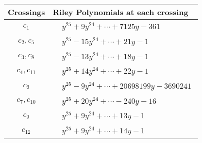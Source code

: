 \documentclass[1p]{elsarticle_modified}
\theoremstyle{definition}
\begin{document}
\begin{tabular}{m{50pt}|m{274pt}}
Crossings & \hspace{64pt}Riley Polynomials at each crossing \\
\hline $$\begin{aligned}c_{1}\end{aligned}$$&$\begin{aligned}
&y^{25}+9 y^{24}+\cdots+7125 y-361
\end{aligned}$\\
\hline $$\begin{aligned}c_{2},c_{5}\end{aligned}$$&$\begin{aligned}
&y^{25}-15 y^{24}+\cdots+21 y-1
\end{aligned}$\\
\hline $$\begin{aligned}c_{3},c_{8}\end{aligned}$$&$\begin{aligned}
&y^{25}-13 y^{24}+\cdots+18 y-1
\end{aligned}$\\
\hline $$\begin{aligned}c_{4},c_{11}\end{aligned}$$&$\begin{aligned}
&y^{25}+14 y^{24}+\cdots+22 y-1
\end{aligned}$\\
\hline $$\begin{aligned}c_{6}\end{aligned}$$&$\begin{aligned}
&y^{25}-9 y^{24}+\cdots+20698199 y-3690241
\end{aligned}$\\
\hline $$\begin{aligned}c_{7},c_{10}\end{aligned}$$&$\begin{aligned}
&y^{25}+20 y^{24}+\cdots-240 y-16
\end{aligned}$\\
\hline $$\begin{aligned}c_{9}\end{aligned}$$&$\begin{aligned}
&y^{25}+9 y^{24}+\cdots+13 y-1
\end{aligned}$\\
\hline $$\begin{aligned}c_{12}\end{aligned}$$&$\begin{aligned}
&y^{25}+9 y^{24}+\cdots+14 y-1
\end{aligned}$\\
\hline
\end{tabular}\\~\\
\end{document}
